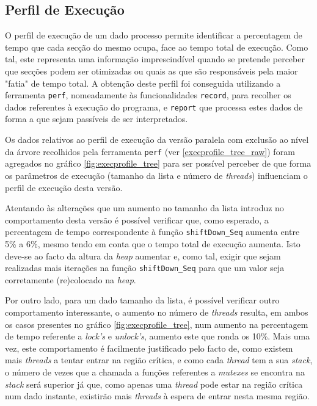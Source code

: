\documentclass{article}
\begin{document}
\subsection{Perfil de Execução}
O perfil de execução de um dado processo permite identificar a percentagem de tempo que cada secção do mesmo ocupa, face ao tempo
total de execução. Como tal, este representa uma informação imprescindível quando se pretende perceber que secções podem ser otimizadas
ou quais as que são responsáveis pela maior "fatia" de tempo total. 
A obtenção deste perfil foi conseguida utilizando a ferramenta \texttt{perf}, nomeadamente às funcionalidades \texttt{record}, para recolher os dados referentes à execução do programa, e \texttt{report} que processa estes dados de forma a que sejam passíveis
de ser interpretados.

Os dados relativos ao perfil de execução da versão paralela com exclusão ao nível da árvore recolhidos pela ferramenta \texttt{perf} 
(ver \ref{execprofile_tree_raw}) foram agregados no gráfico \ref{fig:execprofile_tree} para ser possível perceber de que forma
os parâmetros de execução (tamanho da lista e número de \textit{threads}) influenciam o perfil de execução desta versão. 

Atentando às alterações que um aumento no tamanho da lista introduz no comportamento desta versão é possível verificar que, como esperado,
a percentagem de tempo correspondente à função \texttt{shiftDown\_Seq} aumenta entre 5\% a 6\%, mesmo tendo em conta que o tempo total de
execução aumenta. Isto deve-se ao facto da altura da \textit{heap} aumentar e, como tal, exigir que sejam realizadas mais iterações na 
função \texttt{shiftDown\_Seq} para que um valor seja corretamente (re)colocado na \textit{heap}.

Por outro lado, para um dado tamanho da lista, é possível verificar outro comportamento interessante, o aumento no número de \textit{threads}
resulta, em ambos os casos presentes no gráfico \ref{fig:execprofile_tree}, num aumento na percentagem de tempo referente a \textit{lock's} e 
\textit{unlock's}, aumento este que ronda os 10\%. Mais uma vez, este comportamento é facilmente justificado pelo facto de, como existem mais
\textit{threads} a tentar entrar na região crítica, e como cada \textit{thread} tem a sua \textit{stack}, o número de vezes que a chamada a 
funções referentes a \textit{mutexes} se encontra na \textit{stack} será superior já que, como apenas uma \textit{thread} pode estar na região crítica
num dado instante, existirão mais \textit{threads} à espera de entrar nesta mesma região.
\end{document}
